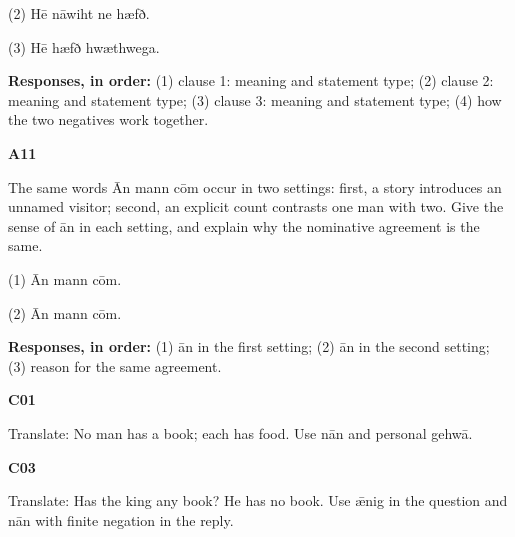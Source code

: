 (2) Hē nāwiht ne hæfð.

(3) Hē hæfð hwæthwega.

\textbf{Responses, in order:} (1) clause 1: meaning and statement type; (2) clause 2: meaning and statement type; (3) clause 3: meaning and statement type; (4) how the two negatives work together.

\par\begin{minipage}{\linewidth}\raggedright
\textbf{A11}

The same words Ān mann cōm occur in two settings: first, a story introduces an unnamed visitor; second, an explicit count contrasts one man with two. Give the sense of ān in each setting, and explain why the nominative agreement is the same.

(1) Ān mann cōm.

(2) Ān mann cōm.

\textbf{Responses, in order:} (1) ān in the first setting; (2) ān in the second setting; (3) reason for the same agreement.

\end{minipage}\par\addvspace{4pt}

\par\begin{minipage}{\linewidth}\raggedright
\textbf{C01}

Translate: No man has a book; each has food. Use nān and personal gehwā.

\end{minipage}\par\addvspace{4pt}

\par\begin{minipage}{\linewidth}\raggedright
\textbf{C03}

Translate: Has the king any book? He has no book. Use ǣnig in the question and nān with finite negation in the reply.

\end{minipage}\par\addvspace{4pt}

